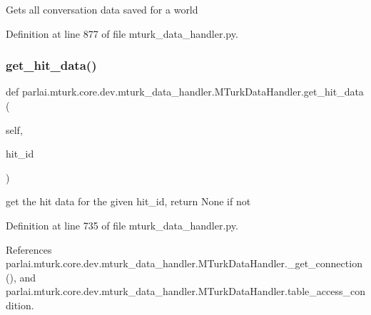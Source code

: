 \begin{DoxyVerb}Gets all conversation data saved for a world\end{DoxyVerb}
 

Definition at line 877 of file mturk\+\_\+data\+\_\+handler.\+py.

\mbox{\label{classparlai_1_1mturk_1_1core_1_1dev_1_1mturk__data__handler_1_1MTurkDataHandler_aac6a98f191bfacfb9092f2d0138fb429}} 
\subsubsection{\texorpdfstring{get\+\_\+hit\+\_\+data()}{get\_hit\_data()}}
{\footnotesize\ttfamily def parlai.\+mturk.\+core.\+dev.\+mturk\+\_\+data\+\_\+handler.\+M\+Turk\+Data\+Handler.\+get\+\_\+hit\+\_\+data (\begin{DoxyParamCaption}\item[{}]{self,  }\item[{}]{hit\+\_\+id }\end{DoxyParamCaption})}

\begin{DoxyVerb}get the hit data for the given hit_id, return None if not\end{DoxyVerb}
 

Definition at line 735 of file mturk\+\_\+data\+\_\+handler.\+py.



References parlai.\+mturk.\+core.\+dev.\+mturk\+\_\+data\+\_\+handler.\+M\+Turk\+Data\+Handler.\+\_\+get\+\_\+connection(), and parlai.\+mturk.\+core.\+dev.\+mturk\+\_\+data\+\_\+handler.\+M\+Turk\+Data\+Handler.\+table\+\_\+access\+\_\+condition.

